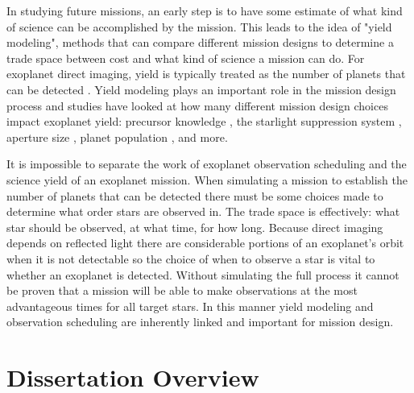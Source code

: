 In studying future missions, an early step is to have some estimate of what
kind of science can be accomplished by the mission. This leads to the idea of
"yield modeling", methods that can compare different mission designs to
determine a trade space between cost and what kind of science a mission can do.
For exoplanet direct imaging, yield is typically treated as the number of
planets that can be detected
\citep{brownSingleVisitPhotometric2005,savranskyAnalyzingDesignsPlanetFinding2010,
starkMaximizingExoEarthCandidate2014}. Yield modeling plays an important role
in the mission design process and studies have looked at how many different
mission design choices impact exoplanet yield: precursor knowledge
\citep{morganFasterExoEarth2021}, the starlight suppression system
\citep{savranskyAnalyzingDesignsPlanetFinding2010,morgan19, Stark2016},
aperture size \citep{starkLowerLimitsAperture2015}, planet population
\citep{savranskyComparisonAnalyticalDepth2016}, and more. 

It is impossible to separate the work of exoplanet observation scheduling and
the science yield of an exoplanet mission. When simulating a mission to
establish the number of planets that can be detected there must be some choices
made to determine what order stars are observed in. The trade space is
effectively: what star should be observed, at what time, for how long. Because
direct imaging depends on reflected light there are considerable portions of an
exoplanet's orbit when it is not detectable so the choice of when to observe a
star is vital to whether an exoplanet is detected. Without simulating the full
process it cannot be proven that a mission will be able to make observations at
the most advantageous times for all target stars. In this manner yield modeling
and observation scheduling are inherently linked and important for mission
design.


\section{Dissertation Overview}
\label{sec:dis_overview}

